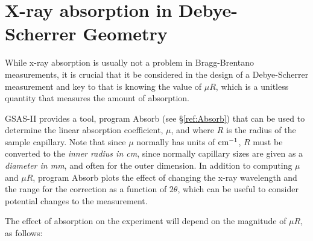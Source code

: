 \section{X-ray absorption in Debye-Scherrer Geometry}\label{ref:muR}
While x-ray absorption is usually not a problem in Bragg-Brentano measurements, it is crucial that it be considered in the design of a Debye-Scherrer measurement and key to that is knowing the value of $\mu R$, which is a unitless quantity that measures the amount of absorption. 

GSAS-II provides a tool, program Absorb (see \S\ref{ref:Absorb}) that can be used to determine the linear absorption coefficient, $\mu$, and where $R$ is the radius of the sample capillary. Note that since $\mu$ normally has units of $\rm cm^{-1}$, $R$ must be converted to the \textit{inner radius in cm}, since normally capillary sizes are given as a \textit{diameter in mm}, and often for the outer dimension. In addition to computing $\mu$ and $\mu R$, program Absorb plots the effect of changing the x-ray wavelength and the range for the correction as a function of $2\theta$, which can be useful to consider potential changes to the measurement. 

The effect of absorption on the experiment will depend on the magnitude of $\mu R$, as follows:

